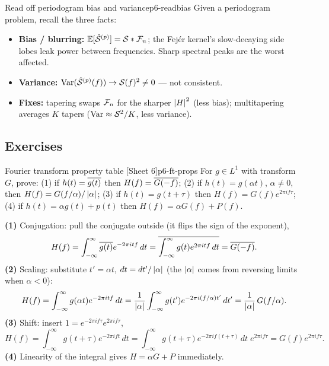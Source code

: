\begin{keytech}{Read off periodogram bias and variance}{p6-readbias}
Given a periodogram problem, recall the three facts:
\begin{itemize}
  \item \textbf{Bias / blurring:} $\mathbb{E}[\hat{\mathcal{S}}^{(p)}]=\mathcal{S}*\mathcal{F}_n$; the Fej\'er
        kernel's slow-decaying side lobes leak power between frequencies.
        Sharp spectral peaks are the worst affected.
  \item \textbf{Variance:} $\operatorname{Var}(\hat{\mathcal{S}}^{(p)}(f))\to\mathcal{S}(f)^2\ne0$ --- not
        consistent.
  \item \textbf{Fixes:} tapering swaps $\mathcal{F}_n$ for the sharper $\left\lvert H \right\rvert^2$
        (less bias); multitapering averages $K$ tapers
        ($\operatorname{Var}\approx\mathcal{S}^2/K$, less variance).
\end{itemize}
\end{keytech}

\subsection{Exercises}

\begin{exercise}{Fourier transform property table \quad\textnormal{[Sheet 6]}}{p6-ft-props}
For $g\in L^1$ with transform $G$, prove: (1) if $h(t)=\overline{g(t)}$ then
$H(f)=\overline{G(-f)}$; (2) if $h(t)=g(\alpha t)$, $\alpha\ne0$, then
$H(f)=G(f/\alpha)/\left\lvert \alpha \right\rvert$; (3) if $h(t)=g(t+\tau)$ then
$H(f)=G(f)e^{2\pi i f\tau}$; (4) if $h(t)=\alpha g(t)+p(t)$ then
$H(f)=\alpha G(f)+P(f)$.
\end{exercise}
\begin{solution}
\textbf{(1)} Conjugation: pull the conjugate outside (it flips the sign of the
exponent),
\[
H(f)=\int_{-\infty}^{\infty}\overline{g(t)}e^{-2\pi i t f}\,dt
=\overline{\int_{-\infty}^{\infty} g(t)e^{2\pi i t f}\,dt}
=\overline{G(-f)} .
\]
\textbf{(2)} Scaling: substitute $t'=\alpha t$, $dt=dt'/\left\lvert \alpha \right\rvert$ (the
$\left\lvert \alpha \right\rvert$ comes from reversing limits when $\alpha<0$):
\[
H(f)=\int_{-\infty}^{\infty} g(\alpha t)e^{-2\pi i t f}\,dt
=\frac{1}{\left\lvert \alpha \right\rvert}\int_{-\infty}^{\infty} g(t')e^{-2\pi i (f/\alpha)t'}\,dt'
=\frac{1}{\left\lvert \alpha \right\rvert}\,G(f/\alpha).
\]
\textbf{(3)} Shift: insert $1=e^{-2\pi i f\tau}e^{2\pi i f\tau}$,
\[
H(f)=\int_{-\infty}^{\infty} g(t+\tau)e^{-2\pi i f t}\,dt
=\int_{-\infty}^{\infty} g(t+\tau)e^{-2\pi i f(t+\tau)}\,dt\;e^{2\pi i f\tau}
=G(f)e^{2\pi i f\tau}.
\]
\textbf{(4)} Linearity of the integral gives $H=\alpha G+P$ immediately.
\end{solution}

